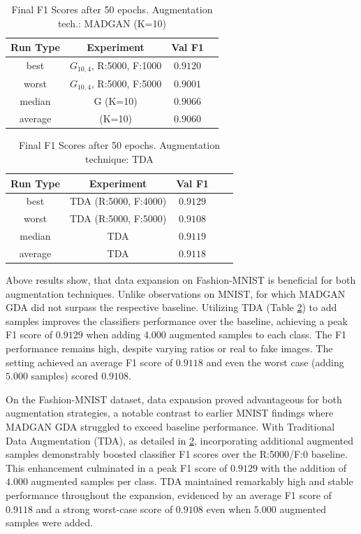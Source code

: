 \begin{table}[H]
	\vspace{-1.5em}
	\centering
	\begin{tabular}{|c|c|c|c|}
		\hline
		Run Type & Experiment & Val F1 \\ \hline
		best & \(G_{10, 4}\), R:5000, F:1000 & $0.9120$\\ \hline
		worst & \(G_{10, 4}\), R:5000, F:5000 & $0.9001$\\ \hline
		median & G (K=10) & $0.9066$\\ \hline
		average & (K=10) & $0.9060$
		\\ \hline
	\end{tabular}
    \caption{Final F1 Scores after 50 epochs. Augmentation tech.: MADGAN (K=10)}
        \label{tab:res_expansion_fashion_tda_vs_madgan__madgan}
\end{table}
\begin{table}[H]
	\centering
	\vspace{-1.5em}
	\begin{tabular}{|c|c|c|c|c|}
		\hline
		Run Type & Experiment & Val F1 \\ \hline
		best & TDA (R:5000, F:4000) & $0.9129$\\ \hline
		worst & TDA (R:5000, F:5000) & $0.9108$\\ \hline
		median & TDA & $0.9119$\\ \hline
		average & TDA & $0.9118$
		\\ \hline
	\end{tabular}
    \caption{Final F1 Scores after 50 epochs. Augmentation technique: TDA}
        \label{tab:res_expansion_fashion_tda_vs_madgan__tda}
\end{table}

Above results show, that data expansion on Fashion-MNIST is beneficial for both augmentation techniques. Unlike observations on MNIST, for which MADGAN GDA did not surpass the respective baseline. Utilizing TDA (Table \ref{tab:res_expansion_fashion_tda_vs_madgan__tda}) to add samples improves the classifiers performance over the baseline, achieving a peak F1 score of $0.9129$ when adding $4.000$ augmented samples to each class. The F1 performance remains high, despite varying ratios or real to fake images. The setting achieved an average F1 score of $0.9118$ and even the worst case (adding $5.000$ samples) scored $0.9108$.

On the Fashion-MNIST dataset, data expansion proved advantageous for both augmentation strategies, a notable contrast to earlier MNIST findings where MADGAN GDA struggled to exceed baseline performance. With Traditional Data Augmentation (TDA), as detailed in \ref{tab:res_expansion_fashion_tda_vs_madgan__tda}, incorporating additional augmented samples demonstrably boosted classifier F1 scores over the R:5000/F:0 baseline. This enhancement culminated in a peak F1 score of $0.9129$ with the addition of $4.000$ augmented samples per class. TDA maintained remarkably high and stable performance throughout the expansion, evidenced by an average F1 score of $0.9118$ and a strong worst-case score of $0.9108$ even when $5.000$ augmented samples were added.

